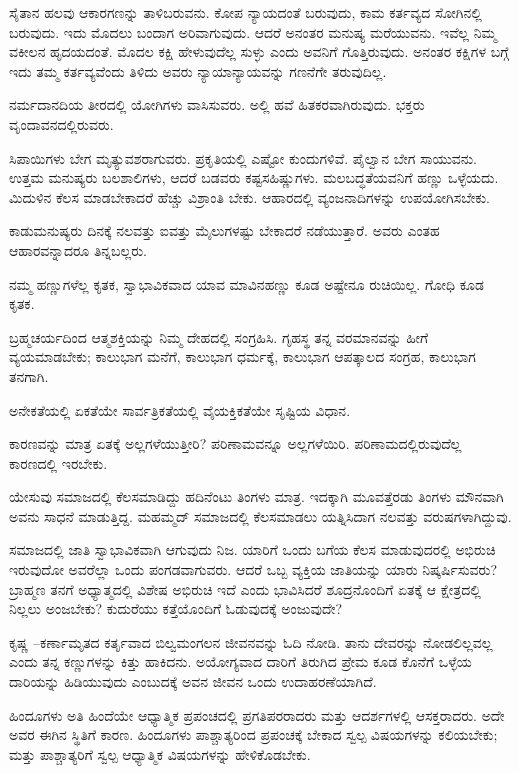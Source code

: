 ಸೈತಾನ ಹಲವು ಆಕಾರಗಣನ್ನು ತಾಳಿಬರುವನು. ಕೋಪ ನ್ಯಾಯದಂತೆ ಬರುವುದು, ಕಾಮ ಕರ್ತವ್ಯದ ಸೋಗಿನಲ್ಲಿ ಬರುವುದು. ಇದು ಮೊದಲು ಬಂದಾಗ ಅರಿವಾಗುವುದು. ಆದರೆ ಅನಂತರ ಮನುಷ್ಯ ಮರೆಯುವನು. ಇವೆಲ್ಲ ನಿಮ್ಮ ವಕೀಲನ ಹೃದಯದಂತೆ. ಮೊದಲ ಕಕ್ಷಿ ಹೇಳುವುದೆಲ್ಲ ಸುಳ್ಳು ಎಂದು ಅವನಿಗೆ ಗೊತ್ತಿರುವುದು. ಅನಂತರ ಕಕ್ಷಿಗಳ ಬಗ್ಗೆ ಇದು ತಮ್ಮ ಕರ್ತವ್ಯವೆಂದು ತಿಳಿದು ಅವರು ನ್ಯಾಯಾನ್ಯಾಯವನ್ನು ಗಣನೆಗೇ ತರುವುದಿಲ್ಲ.

ನರ್ಮದಾನದಿಯ ತೀರದಲ್ಲಿ ಯೋಗಿಗಳು ವಾಸಿಸುವರು. ಅಲ್ಲಿ ಹವೆ ಹಿತಕರವಾಗಿರುವುದು. ಭಕ್ತರು ವೃಂದಾವನದಲ್ಲಿರುವರು.

ಸಿಪಾಯಿಗಳು ಬೇಗ ಮೃತ್ಯುವಶರಾಗುವರು. ಪ್ರಕೃತಿಯಲ್ಲಿ ಎಷ್ಟೋ ಕುಂದುಗಳಿವೆ. ಪೈಲ್ವಾನ ಬೇಗ ಸಾಯುವನು. ಉತ್ತಮ ಮನುಷ್ಯರು  ಬಲಶಾಲಿಗಳು, ಆದರೆ ಬಡವರು ಕಷ್ಟಸಹಿಷ್ಣುಗಳು. ಮಲಬದ್ಧತೆಯವನಿಗೆ ಹಣ್ಣು ಒಳ್ಳೆಯದು. ಮಿದುಳಿನ ಕೆಲಸ ಮಾಡಬೇಕಾದರೆ ಹೆಚ್ಚು ವಿಶ್ರಾಂತಿ ಬೇಕು. ಆಹಾರದಲ್ಲಿ ವ್ಯಂಜನಾದಿಗಳನ್ನು ಉಪಯೋಗಿಸಬೇಕು.

ಕಾಡುಮನುಷ್ಯರು ದಿನಕ್ಕೆ ನಲವತ್ತು ಐವತ್ತು ಮೈಲುಗಳಷ್ಟು ಬೇಕಾದರೆ ನಡೆಯುತ್ತಾರೆ. ಅವರು ಎಂತಹ ಆಹಾರವನ್ನಾದರೂ ತಿನ್ನಬಲ್ಲರು.

ನಮ್ಮ ಹಣ್ಣುಗಳೆಲ್ಲ ಕೃತಕ, ಸ್ವಾಭಾವಿಕವಾದ ಯಾವ ಮಾವಿನಹಣ್ಣು ಕೂಡ ಅಷ್ಟೇನೂ ರುಚಿಯಿಲ್ಲ. ಗೋಧಿ ಕೂಡ ಕೃತಕ.

ಬ್ರಹ್ಮಚರ್ಯದಿಂದ ಆತ್ಮಶಕ್ತಿಯನ್ನು ನಿಮ್ಮ ದೇಹದಲ್ಲಿ ಸಂಗ್ರಹಿಸಿ. ಗೃಹಸ್ಥ ತನ್ನ ವರಮಾನವನ್ನು ಹೀಗೆ ವ್ಯಯಮಾಡಬೇಕು; ಕಾಲುಭಾಗ ಮನೆಗೆ, ಕಾಲುಭಾಗ ಧರ್ಮಕ್ಕೆ, ಕಾಲುಭಾಗ ಆಪತ್ಕಾಲದ ಸಂಗ್ರಹ, ಕಾಲುಭಾಗ ತನಗಾಗಿ.

ಅನೇಕತೆಯಲ್ಲಿ ಏಕತೆಯೇ ಸಾರ್ವತ್ರಿಕತೆಯಲ್ಲಿ ವೈಯಕ್ತಿಕತೆಯೇ ಸೃಷ್ಟಿಯ ವಿಧಾನ.

ಕಾರಣವನ್ನು ಮಾತ್ರ ಏತಕ್ಕೆ ಅಲ್ಲಗಳೆಯುತ್ತೀರಿ? ಪರಿಣಾಮವನ್ನೂ ಅಲ್ಲಗಳೆಯಿರಿ. ಪರಿಣಾಮದಲ್ಲಿರುವುದೆಲ್ಲ ಕಾರಣದಲ್ಲಿ ಇರಬೇಕು.

ಯೇಸುವು ಸಮಾಜದಲ್ಲಿ ಕೆಲಸಮಾಡಿದ್ದು ಹದಿನೆಂಟು ತಿಂಗಳು ಮಾತ್ರ. ಇದಕ್ಕಾಗಿ ಮೂವತ್ತೆರಡು ತಿಂಗಳು ಮೌನವಾಗಿ ಅವನು ಸಾಧನೆ ಮಾಡುತ್ತಿದ್ದ. ಮಹಮ್ಮದ್ ಸಮಾಜದಲ್ಲಿ ಕೆಲಸಮಾಡಲು ಯತ್ನಿಸಿದಾಗ ನಲವತ್ತು ವರುಷಗಳಾಗಿದ್ದುವು.

ಸಮಾಜದಲ್ಲಿ ಜಾತಿ ಸ್ವಾಭಾವಿಕವಾಗಿ ಆಗುವುದು ನಿಜ. ಯಾರಿಗೆ ಒಂದು ಬಗೆಯ ಕೆಲಸ ಮಾಡುವುದರಲ್ಲಿ ಅಭಿರುಚಿ ಇರುವುದೋ ಅವರೆಲ್ಲಾ ಒಂದು ಪಂಗಡವಾಗುವರು. ಆದರೆ ಒಬ್ಬ ವ್ಯಕ್ತಿಯ ಜಾತಿಯನ್ನು ಯಾರು ನಿಷ್ಕರ್ಷಿಸುವರು? ಬ್ರಾಹ್ಮಣ ತನಗೆ ಅಧ್ಯಾತ್ಮದಲ್ಲಿ ವಿಶೇಷ ಅಭಿರುಚಿ ಇದೆ ಎಂದು ಭಾವಿಸಿದರೆ ಶೂದ್ರನೊಂದಿಗೆ ಏತಕ್ಕೆ ಆ ಕ್ಷೇತ್ರದಲ್ಲಿ ನಿಲ್ಲಲು ಅಂಜಬೇಕು? ಕುದುರೆಯು ಕತ್ತೆಯೊಂದಿಗೆ ಓಡುವುದಕ್ಕೆ ಅಂಜುವುದೇ?

ಕೃಷ್ಣ –ಕರ್ಣಾಮೃತದ ಕರ್ತೃವಾದ ಬಿಲ್ವಮಂಗಲನ ಜೀವನವನ್ನು ಓದಿ ನೋಡಿ. ತಾನು ದೇವರನ್ನು ನೋಡಲಿಲ್ಲವಲ್ಲ ಎಂದು ತನ್ನ ಕಣ್ಣುಗಳನ್ನು ಕಿತ್ತು ಹಾಕಿದನು. ಅಯೋಗ್ಯವಾದ ದಾರಿಗೆ ತಿರುಗಿದ ಪ್ರೇಮ ಕೂಡ ಕೊನೆಗೆ ಒಳ್ಳೆಯ ದಾರಿಯನ್ನು ಹಿಡಿಯುವುದು ಎಂಬುದಕ್ಕೆ ಅವನ ಜೀವನ ಒಂದು ಉದಾಹರಣೆಯಾಗಿದೆ.

ಹಿಂದೂಗಳು ಅತಿ ಹಿಂದೆಯೇ ಆಧ್ಯಾತ್ಮಿಕ ಪ್ರಪಂಚದಲ್ಲಿ ಪ್ರಗತಿಪರರಾದರು ಮತ್ತು ಆದರ್ಶಗಳಲ್ಲಿ ಆಸಕ್ತರಾದರು. ಅದೇ ಅವರ ಈಗಿನ ಸ್ಥಿತಿಗೆ ಕಾರಣ. ಹಿಂದೂಗಳು ಪಾಶ್ಚಾತ್ಯರಿಂದ ಪ್ರಪಂಚಕ್ಕೆ ಬೇಕಾದ ಸ್ವಲ್ಪ ವಿಷಯಗಳನ್ನು ಕಲಿಯಬೇಕು; ಮತ್ತು ಪಾಶ್ಚಾತ್ಯರಿಗೆ ಸ್ವಲ್ಪ ಆಧ್ಯಾತ್ಮಿಕ ವಿಷಯಗಳನ್ನು ಹೇಳಿಕೊಡಬೇಕು.

